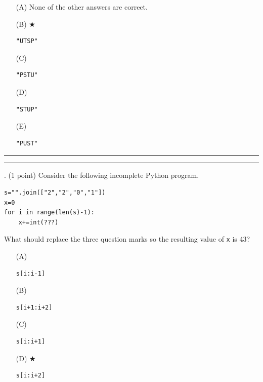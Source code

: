 \documentclass{article}
\newcounter{question}
\begin{document}
\begin{enumerate}
\item[(A)]
None of the other answers are correct.

\item[(B)] $\bigstar$ 
\begin{verbatim}"UTSP"\end{verbatim}

\item[(C)]
\begin{verbatim}"PSTU"\end{verbatim}

\item[(D)]
\begin{verbatim}"STUP"\end{verbatim}

\item[(E)]
\begin{verbatim}"PUST"\end{verbatim}

\end{enumerate}

\vspace*{2em}
\hrule
\vspace{2em}

\vspace{2em}
\hrule height 2pt


\newpage
{}. (1 point)
Consider the following incomplete Python program.
\begin{verbatim}
s="".join(["2","2","0","1"])
x=0
for i in range(len(s)-1):
    x+=int(???)
\end{verbatim}
What should replace the three question marks so the resulting value of \texttt{x} is 43?


\begin{enumerate}
\item[(A)]
\begin{verbatim}s[i:i-1]\end{verbatim}

\item[(B)]
\begin{verbatim}s[i+1:i+2]\end{verbatim}

\item[(C)]
\begin{verbatim}s[i:i+1]\end{verbatim}

\item[(D)] $\bigstar$ 
\begin{verbatim}s[i:i+2]\end{verbatim}

\end{enumerate}
\end{document}
